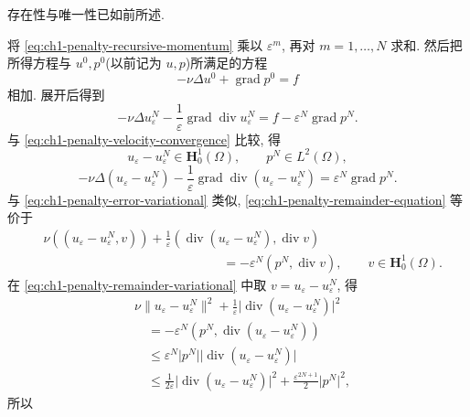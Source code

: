 \begin{Proof}
存在性与唯一性已如前所述.

将 \eqref{eq:ch1-penalty-recursive-momentum} 乘以 $\varepsilon^m$, 再对 $m=1,\ldots,N$ 求和. 然后把所得方程与 $u^0,p^0$(以前记为 $u,p$)所满足的方程
\[
-\nu\Delta u^0+\operatorname{grad}p^0=f
\]
相加. 展开后得到
\[
-\nu\Delta u_\varepsilon^N
-\frac{1}{\varepsilon}\operatorname{grad}\operatorname{div}u_\varepsilon^N
=f-\varepsilon^N\operatorname{grad}p^N.
\]
与 \eqref{eq:ch1-penalty-velocity-convergence} 比较, 得
\begin{equation}
u_\varepsilon-u_\varepsilon^N\in\mathbf H_0^1(\Omega),
\qquad p^N\in L^2(\Omega),
\label{eq:ch1-penalty-remainder-spaces}
\end{equation}
\begin{equation}
-\nu\Delta(u_\varepsilon-u_\varepsilon^N)
-\frac{1}{\varepsilon}\operatorname{grad}\operatorname{div}
(u_\varepsilon-u_\varepsilon^N)
=\varepsilon^N\operatorname{grad}p^N.
\label{eq:ch1-penalty-remainder-equation}
\end{equation}
与 \eqref{eq:ch1-penalty-error-variational} 类似, \eqref{eq:ch1-penalty-remainder-equation} 等价于
\begin{equation}
\begin{aligned}
&\nu((u_\varepsilon-u_\varepsilon^N,v))
+\frac{1}{\varepsilon}
(\operatorname{div}(u_\varepsilon-u_\varepsilon^N),\operatorname{div}v)\\
&\hspace{14em}=-\varepsilon^N(p^N,\operatorname{div}v),
\qquad v\in\mathbf H_0^1(\Omega).
\end{aligned}
\label{eq:ch1-penalty-remainder-variational}
\end{equation}
在 \eqref{eq:ch1-penalty-remainder-variational} 中取 $v=u_\varepsilon-u_\varepsilon^N$, 得
\[
\begin{aligned}
&\nu\lVert u_\varepsilon-u_\varepsilon^N\rVert^2
+\frac{1}{\varepsilon}
\lvert\operatorname{div}(u_\varepsilon-u_\varepsilon^N)\rvert^2\\
&\quad=-\varepsilon^N(p^N,\operatorname{div}(u_\varepsilon-u_\varepsilon^N))\\
&\quad\leq\varepsilon^N\lvert p^N\rvert
\lvert\operatorname{div}(u_\varepsilon-u_\varepsilon^N)\rvert\\
&\quad\leq\frac{1}{2\varepsilon}
\lvert\operatorname{div}(u_\varepsilon-u_\varepsilon^N)\rvert^2
+\frac{\varepsilon^{2N+1}}{2}\lvert p^N\rvert^2,
\end{aligned}
\]
所以
\begin{equation}

\end{equation}
\end{Proof}
